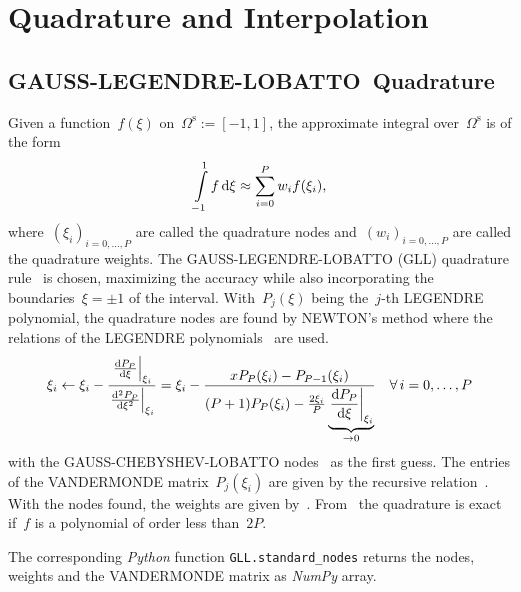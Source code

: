 \documentclass[10pt, ngerman, english,
twoside, open=right,
numbers=noenddot,
declaration=section,
abstract=section,
abstract=multiple,
abstract=notoc,
declaration=notoc,
cd=pale, 
chapterprefix=off, 
chapterpage=false, 
headingsvskip=-10em,
cdgeometry=custom, 
slantedgreek=on,
cdmath=on, 
cdfont=on,
ttfont=false,
mathswap=off,
]{tudscrreprt}
\numberwithin{equation}{chapter}
\renewcommand{\textsc}[1]{\uppercase{\mbox{#1}}}
\newcommand{\sidenote}[1]{
  \leavevmode %
  \marginpar{\hyphenpenalty=1000 \flushleft{\textcolor{HKS41}{#1}}}}
\begin{document}
\printbibliography[heading=bibintoc]
\appendix
\chapter{Quadrature and Interpolation}\label{sec:GLL}
\section{\textsc{Gau\ss}-\textsc{Legendre}-\textsc{Lobatto}~Quadrature}
\sidenote{GLL Quadrature Rule}Given a function~$f(\xi)$ on~$\Omega^\text{s}:=[-1, 1]$, the approximate integral over~$\Omega^\text{s}$ is of the form
\begin{equation}
\bint{f}{\xi}{-1}{1} \approx \sum_{i=0}^P w_i f(\xi_i)\text{,}\label{eq:GLL_quadRule}
\end{equation}
where~$\left(\xi_i\right)_{i=0,\ldots,P}$ are called the quadrature nodes and~$\left(w_i\right)_{i=0,\ldots,P}$ are called the quadrature weights. The \textsc{Gau\ss}-\textsc{Legendre}-\textsc{Lobatto} (\textsc{GLL}) quadrature rule~\cite[see][Eq.~B.2.9]{DevilleFischer} is chosen, maximizing the accuracy while also incorporating the boundaries~$\xi = \pm 1$ of the interval. With~$P_j(\xi)$ being the~$j$-th \textsc{Legendre} polynomial, the quadrature nodes are found by \textsc{Newton}'s method where the relations of the \textsc{Legendre} polynomials~\cite[see][entry~22.8.5 and entry~22.6.13]{Abramowitz} are used.
\begin{equation}
\xi_i \gets \xi_i - \frac{\diffa{P_P}{\xi}{\xi_i}}{\diffa[2]{P_P}{\xi}{\xi_i}} = \xi_i - \frac{x P_P(\xi_i) - P_{P-1}(\xi_i)}{(P+1)P_P(\xi_i) - \frac{2\xi_i}{P} \underbrace{\diffa{P_P}{\xi}{\xi_i}}_{\rightarrow 0}}\quad \forall\, i=0,\ldots,P
\end{equation}
with the \textsc{Gau\ss}-\textsc{Chebyshev}-\textsc{Lobatto} nodes~\cite[Eq.~B.2.13]{DevilleFischer} as the first guess. The entries of the \textsc{Vandermonde} matrix~$P_j(\xi_i)$ are given by the recursive relation~\cite[entry~22.7.10]{Abramowitz}. 
With the nodes found, the weights are given by~\cite[see][Eq.~B.2.9]{DevilleFischer}. From~\cite[entry~25.4.32]{Abramowitz} the quadrature is exact if~$f$ is a polynomial of order less than~$2P$.\par
\sidenote{\textit{Python} Functions}The corresponding \textit{Python} function \texttt{GLL.standard\_nodes} returns the nodes, weights and the \textsc{Vandermonde} matrix as \textit{NumPy} array.
\end{document}
